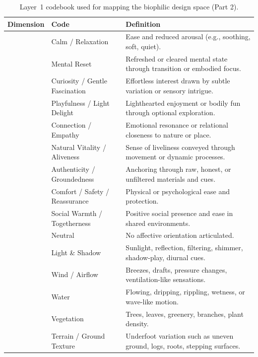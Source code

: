 \begin{table}[!ht]
\caption{Layer~1 codebook used for mapping the biophilic design space (Part 2).}
\label{tab:layer1-codebook-continued}
\centering
\begin{tabular}{@{}
  >{\centering\arraybackslash}p{}
  p{}
  p{}
@{}}
\toprule
\textbf{Dimension} & \textbf{Code} & \textbf{Definition} \\
\midrule
\multirow{10}{*}{\textbf{Affective Aim}} & Calm / Relaxation & Ease and reduced arousal (e.g., soothing, soft, quiet). \\
& Mental Reset & Refreshed or cleared mental state through transition or embodied focus. \\
& Curiosity / Gentle Fascination & Effortless interest drawn by subtle variation or sensory intrigue. \\
& Playfulness / Light Delight & Lighthearted enjoyment or bodily fun through optional exploration. \\
& Connection / Empathy & Emotional resonance or relational closeness to nature or place. \\
& Natural Vitality / Aliveness & Sense of liveliness conveyed through movement or dynamic processes. \\
& Authenticity / Groundedness & Anchoring through raw, honest, or unfiltered materials and cues. \\
& Comfort / Safety / Reassurance & Physical or psychological ease and protection. \\
& Social Warmth / Togetherness & Positive social presence and ease in shared environments. \\
& Neutral & No affective orientation articulated. \\
\midrule
\multirow{9}{*}{\textbf{Natural Reference}} & Light \& Shadow & Sunlight, reflection, filtering, shimmer, shadow-play, diurnal cues. \\
& Wind / Airflow & Breezes, drafts, pressure changes, ventilation-like sensations. \\
& Water & Flowing, dripping, rippling, wetness, or wave-like motion. \\
& Vegetation & Trees, leaves, greenery, branches, plant density. \\
& Terrain / Ground Texture & Underfoot variation such as uneven ground, logs, roots, stepping surfaces. \\

\end{tabular}
\end{table}
